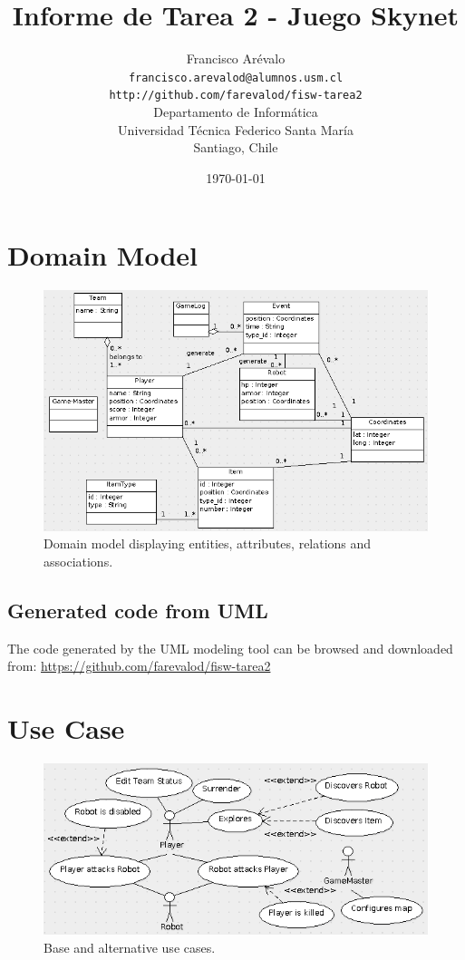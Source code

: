 \documentclass{beamer}
\title{Informe de Tarea 2 - Juego Skynet}
\author{Francisco Ar\'evalo\\
  \texttt{francisco.arevalod@alumnos.usm.cl}\\
  \texttt{http://github.com/farevalod/fisw-tarea2}\\
  \vspace{10mm}
  Departamento de Inform\'atica\\
  Universidad T\'ecnica Federico Santa Mar\'ia\\
  Santiago, Chile}
\date{\today}
\begin{document}
\maketitle
\tableofcontents
\section{Domain Model}
\begin{frame}
\begin{figure}[htb]
\centering
\includegraphics[scale=0.3]{domain-model}
\caption{Domain model displaying entities, attributes, relations and associations.}
\end{figure}
\subsection{Generated code from UML}
The code generated by the UML modeling tool can be browsed and downloaded from: 
\url{https://github.com/farevalod/fisw-tarea2}
\end{frame}
\section{Use Case}
\begin{frame}
\begin{figure}[htb]
\centering
\includegraphics[scale=0.3]{basic-use-case}
\caption{Base and alternative use cases.}
\end{figure}
\end{frame}
\end{document}
